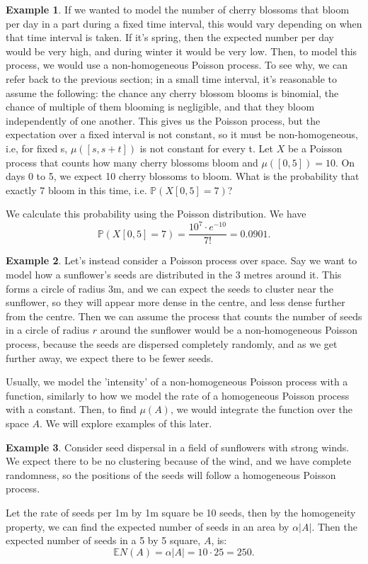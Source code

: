 \documentclass[11pt, oneside]{article}   	%
\theoremstyle{definition}
\newtheorem{example}{Example}[section]
\theoremstyle{remark}
\begin{document}
\begin{example}
  If we wanted to model the number of cherry blossoms that bloom per day in a part during a fixed time interval, this would vary depending on when that time interval is taken. If it's spring, then the expected number per day would be very high, and during winter it would be very low. Then, to model this process, we would use a non-homogeneous Poisson process. To see why, we can refer back to the previous section; in a small time interval, it's reasonable to assume the following: the chance any cherry blossom blooms is binomial, the chance of multiple of them blooming is negligible, and that they bloom independently of one another. This gives us the Poisson process, but the expectation over a fixed interval is not constant, so it must be non-homogeneous, i.e, for fixed s, $\mu([s,s+t])$ is not constant for every t.
  Let $X$ be a Poisson process that counts how many cherry blossoms bloom and $\mu([0,5])=10$. On days 0 to 5, we expect 10 cherry blossoms to bloom. What is the probability that exactly 7 bloom in this time, i.e. $\mathbb{P}(X[0,5]=7)$?

  We calculate this probability using the Poisson distribution. We have $$\mathbb{P}(X[0,5]=7)=\frac{10^7\cdot e^{-10}}{7!}=0.0901.$$
\end{example}

\begin{example}
  Let's instead consider a Poisson process over space. Say we want to model how a sunflower's seeds are distributed in the 3 metres around it. This forms a circle of radius 3m, and we can expect the seeds to cluster near the sunflower, so they will appear more dense in the centre, and less dense further from the centre. Then we can assume the process that counts the number of seeds in a circle of radius $r$ around the sunflower would be a non-homogeneous Poisson process, because the seeds are dispersed completely randomly, and as we get further away, we expect there to be fewer seeds.

  Usually, we model the 'intensity' of a non-homogeneous Poisson process with a function, similarly to how we model the rate of a homogeneous Poisson process with a constant. Then, to find $\mu(A)$, we would integrate the function over the space $A$. We will explore examples of this later.
\end{example}


\begin{example}
  Consider seed dispersal in a field of sunflowers with strong winds. We expect there to be no clustering because of the wind, and we have complete randomness, so the positions of the seeds will follow a homogeneous Poisson process.

  Let the rate of seeds per 1m by 1m square be 10 seeds, then by the homogeneity property, we can find the expected number of seeds in an area by $\alpha |A|$. Then the expected number of seeds in a 5 by 5 square, $A$, is:
  $$\mathbb{E}N(A)=\alpha|A|=10\cdot 25 = 250.$$
\end{example}
\end{document}
